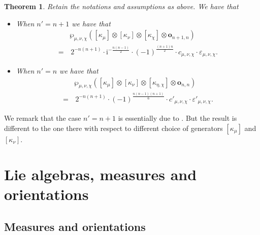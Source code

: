 \documentclass[12pt, a4paper]{amsart}
\theoremstyle{Theorem}
\theoremstyle{Theorem}
\theoremstyle{Theorem}
\theoremstyle{Theorem}
\newtheorem{thmp}[prp]{Theorem}
\theoremstyle{Plain}
\theoremstyle{Definition}
\begin{document}
	
	\begin{thmp}
		\label{mainthm}
		Retain the notations and assumptions as above. We have that
		\begin{itemize}
			\item[(1)] When $n'=n+1$ we have that
			\[
			\begin{aligned}
				&\wp_{\mu,\nu,\chi}\left([\kappa_{\mu}]\otimes[\kappa_{\nu}]\otimes[\kappa_{\chi}]\otimes\mathbf{o}_{n+1,n}\right)\\
				=&\,2^{-n(n+1)}\cdot\mathrm{i}^{-\frac{n(n-1)}{2}}\cdot(-1)^{\frac{(n+1)n}{2}}\cdot c_{\mu,\nu,\chi}\cdot\varepsilon_{\mu,\nu,\chi}.
			\end{aligned}
			\]
			\item[(2)] When $n'=n$ we have that
			\[
			\begin{aligned}
				&\wp_{\mu,\nu,\chi}\left([\kappa_{\mu}]\otimes[\kappa_{\nu}]\otimes[\kappa_{\eta,\chi}]\otimes\mathbf{o}_{n,n}\right)\\
				=&\,2^{-n(n+1)}\cdot (-1)^{\frac{n(n-1)(n+1)}{6}}\cdot c'_{\mu,\nu,\chi}\cdot\varepsilon'_{\mu,\nu,\chi}.
			\end{aligned}
			\]
		\end{itemize}
	\end{thmp}
	
	
	We remark that the case $n'=n+1$ is essentially due to \cite[Theorem 2.17]{HMN}. But the result is different to the one there with respect to different choice of generators $[\kappa_{\mu}]$ and $[\kappa_{\nu}]$.
	
	
	
	
	
	\section{Lie algebras, measures and orientations}
	
	\subsection{Measures and orientations}\label{orientation}
	
\end{document}
